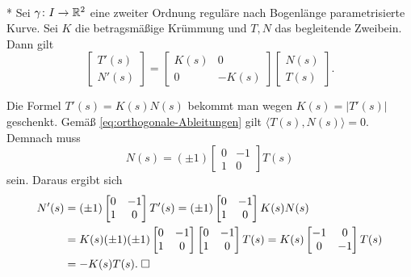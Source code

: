 \begin{theorem}\mbox{}\\*
Sei $\gamma\colon I\to\mathbb R^2$ eine zweiter Ordnung reguläre nach
Bogenlänge parametrisierte Kurve. Sei $K$ die betragsmäßige
Krümmung und $T,N$ das begleitende Zweibein. Dann gilt%
\begin{equation}
\begin{bmatrix}
T'(s)\\ N'(s)
\end{bmatrix}
= \begin{bmatrix}
K(s)  & 0\\
0 & -K(s)
\end{bmatrix}\begin{bmatrix}
N(s)\\ T(s)
\end{bmatrix}.
\end{equation}
\end{theorem}

\noindent{}
Die Formel $T'(s) = K(s)N(s)$ bekommt man wegen $K(s)=|T'(s)|$
geschenkt. Gemäß \eqref{eq:orthogonale-Ableitungen} gilt
$\langle T(s),N(s)\rangle=0$. Demnach muss
\begin{equation}
N(s) = (\pm 1)\begin{bmatrix}0 & -1\\ 1 & 0\end{bmatrix}T(s)
\end{equation}
sein. Daraus ergibt sich
\begin{align}
N'(s) &= (\pm 1)\begin{bmatrix}0 & -1\\ 1 & 0\end{bmatrix}T'(s)
= (\pm 1)\begin{bmatrix}0 & -1\\ 1 & 0\end{bmatrix}K(s)N(s)\\
&= K(s)(\pm 1)(\pm 1)\begin{bmatrix}0 & -1\\ 1 & 0\end{bmatrix}
  \begin{bmatrix}0 & -1\\ 1 & 0\end{bmatrix}T(s)
= K(s)\begin{bmatrix}-1 & 0\\ 0 & -1\end{bmatrix}T(s)\\
&= -K(s)T(s).\;\Box
\end{align}

